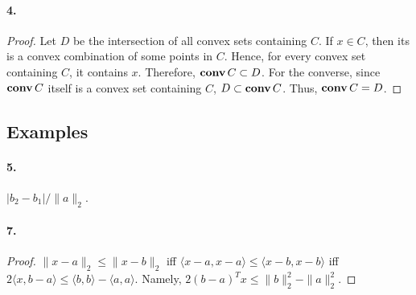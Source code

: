   \paragraph{4.}
  \begin{proof}
    Let $D$ be the intersection of all convex sets containing $C$. If $x\in C$,
    then its is a convex combination of some points in $C$. Hence, for every 
    convex set containing $C$, it contains $x$. Therefore, $\operatorname{\mathbf{conv}} C\subset D$.
    For the converse, since $\operatorname{\mathbf{conv}} C$ itself is a convex set containing $C$, $D
    \subset\operatorname{\mathbf{conv}} C$. Thus, $\operatorname{\mathbf{conv}} C=D$.
  \end{proof}


\subsection{Examples}
  \paragraph{5.}
  \begin{solution}
    $|b_2-b_1|/\|a\|_2$.
  \end{solution}

  \paragraph{7.}
  \begin{proof}
    $\|x-a\|_2\le\|x-b\|_2$ iff $\langle x-a, x-a\rangle \le \langle x-b, x-b
    \rangle$ iff $2\langle x,b-a\rangle \le \langle b,b\rangle-\langle a,a
    \rangle$. Namely, $2(b-a)^Tx \le \|b\|_2^2-\|a\|_2^2$.
  \end{proof}

